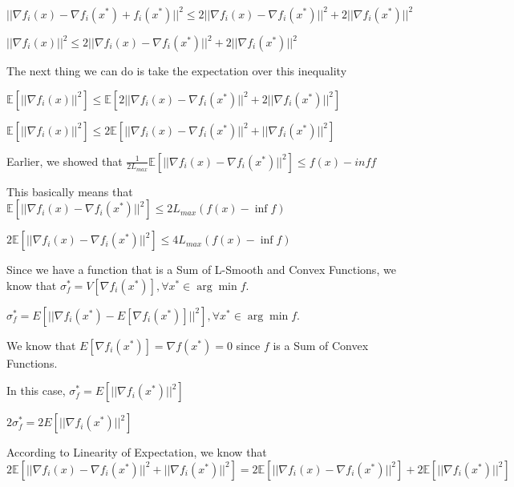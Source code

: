 $||\nabla f_i(x) - \nabla f_i(x^*) + f_i(x^*)||^2 \leq 2||\nabla f_i(x) - \nabla f_i(x^*)||^2 + 2||\nabla f_i(x^*)||^2$ \newline 

$||\nabla f_i(x)||^2 \leq 2||\nabla f_i(x) - \nabla f_i(x^*)||^2 + 2||\nabla f_i(x^*)||^2$ \newline 

The next thing we can do is take the expectation over this inequality \newline

\noindent $\mathbb{E}[||\nabla f_i(x)||^2] \leq \mathbb{E} [2||\nabla f_i(x) - \nabla f_i(x^*)||^2 + 2||\nabla f_i(x^*)||^2]$ \newline 

$\mathbb{E}[||\nabla f_i(x)||^2] \leq 2\mathbb{E} [||\nabla f_i(x) - \nabla f_i(x^*)||^2 + ||\nabla f_i(x^*)||^2]$ \newline 

Earlier, we showed that $\frac{1}{2L_{max}} \mathbb{E}[||\nabla f_i(x) - \nabla f_i(x^*)||^2] \leq f(x) - inf f$ \newline 

This basically means that $\mathbb{E}[||\nabla f_i(x) - \nabla f_i(x^*)||^2] \leq 2L_{max} (f(x) - \inf f)$ \newline 

$2\mathbb{E}[||\nabla f_i(x) - \nabla f_i(x^*)||^2] \leq 4L_{max} (f(x) - \inf f)$

Since we have a function that is a Sum of L-Smooth and Convex Functions, we know that \newline 
\noindent $\sigma_f^* = V[\nabla f_i(x^*)], \forall x^* \in \arg \min f.$ \newline 

\noindent $\sigma_f^* = E[||\nabla f_i(x^*) - E[\nabla f_i(x^*)]||^2], \forall x^* \in \arg \min f.$ \newline 

We know that $E[\nabla f_i(x^*)] = \nabla f(x^*) = 0$ since $f$ is a Sum of Convex Functions. \newline 

In this case, 
\noindent $\sigma_f^* = E[||\nabla f_i(x^*)||^2]$ \newline 

$2 \sigma_f^* = 2 E[||\nabla f_i(x^*)||^2]$ \newline 

According to Linearity of Expectation, we know that \newline 
$2\mathbb{E} [||\nabla f_i(x) - \nabla f_i(x^*)||^2 + ||\nabla f_i(x^*)||^2] = 2\mathbb{E} [||\nabla f_i(x) - \nabla f_i(x^*)||^2] + 2 \mathbb{E}  [||\nabla f_i(x^*)||^2]$


